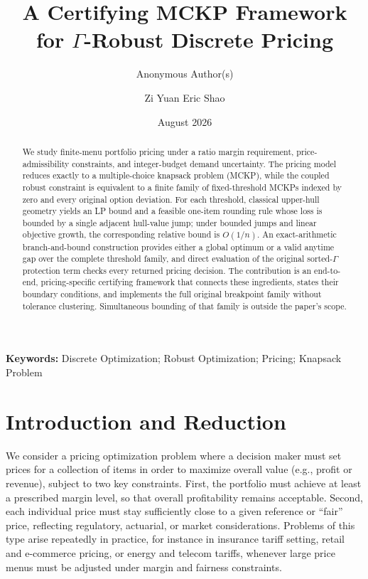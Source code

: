 \documentclass[11pt, a4paper]{article}
\title{A Certifying MCKP Framework for $\Gamma$-Robust Discrete Pricing}
\author{Anonymous Author(s)}
\affil{}
\author{Zi Yuan Eric Shao}
\affil{Department of Mathematics, ETH Zürich, \texttt{ershao@student.ethz.ch}}
\date{August 2026}
\makeatletter
\renewcommand{\maketitle}{
    \begin{center}
        {\LARGE \bfseries \@title \par}
        \vspace{1.0em}
        {\large \@author \par}
        \vspace{0.5em}
        {\itshape \@date}
    \end{center}
    \vspace{1.0em}
}
\theoremstyle{plain}
\theoremstyle{definition}
\theoremstyle{remark}
\newcommand{\keywords}[1]{\vspace{1em}\noindent\textbf{Keywords:} #1}
\makeatother
\begin{document}
\maketitle

\begin{abstract}
We study finite-menu portfolio pricing under a ratio margin requirement, price-admissibility constraints, and integer-budget demand uncertainty.  The pricing model reduces exactly to a multiple-choice knapsack problem (MCKP), while the coupled robust constraint is equivalent to a finite family of fixed-threshold MCKPs indexed by zero and every original option deviation.  For each threshold, classical upper-hull geometry yields an LP bound and a feasible one-item rounding rule whose loss is bounded by a single adjacent hull-value jump; under bounded jumps and linear objective growth, the corresponding relative bound is $O(1/n)$.  An exact-arithmetic branch-and-bound construction provides either a global optimum or a valid anytime gap over the complete threshold family, and direct evaluation of the original sorted-$\Gamma$ protection term checks every returned pricing decision.  The contribution is an end-to-end, pricing-specific certifying framework that connects these ingredients, states their boundary conditions, and implements the full original breakpoint family without tolerance clustering.  Simultaneous bounding of that family is outside the paper's scope.
\end{abstract}

\keywords{Discrete Optimization; Robust Optimization; Pricing; Knapsack Problem}

\section{Introduction and Reduction}\label{sec:intro}
We consider a pricing optimization problem where a decision maker must set prices for a collection of items in order to maximize overall value (e.g., profit or revenue), subject to two key constraints. First, the portfolio must achieve at least a prescribed margin level, so that overall profitability remains acceptable. Second, each individual price must stay sufficiently close to a given reference or ``fair'' price, reflecting regulatory, actuarial, or market considerations. Problems of this type arise repeatedly in practice, for instance in insurance tariff setting, retail and e-commerce pricing, or energy and telecom tariffs, whenever large price menus must be adjusted under margin and fairness constraints.
\end{document}

